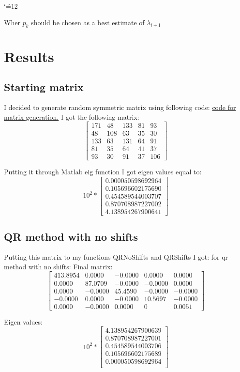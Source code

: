 \documentclass[12pt]{report}
\newenvironment{simplechar}{%
   \catcode`\^=12
}{}
\begin{document}
\begin{simplechar}
Wher $p_k$ should be chosen as a best estimate of $\lambda_{i+1}$

\newpage
\section{Results}
\subsection{Starting matrix}
I decided to generate random symmetric matrix using following code:
\hyperlink{function4_matrix_generation}{code for matrix generation.}
I got the following matrix:
\[
\begin{bmatrix}
171  &  48  & 133  &  81  &  93 \\
 48  & 108  &  63  &  35  &  30 \\
133  &  63  & 131  &  64  &  91 \\
 81  &  35  &  64  &  41  &  37 \\
 93  &  30  &  91  &  37  & 106
\end{bmatrix}
\]

Putting it through Matlab eig function I got eigen values equal to:
\[
10^{2} *
\begin{bmatrix}
  0.000050598692964 \\
  0.105696602175690 \\
  0.454589544003707 \\
  0.870708987227002 \\
  4.138954267900641
\end{bmatrix}
\]

\newpage
\subsection{QR method with no shifts}
Putting this matrix to my functions QRNoShifts and QRShifts I got:
for qr method with no shifts:
Final matrix:
\[
\begin{bmatrix}
413.8954  &  0.0000  & -0.0000  &  0.0000  &  0.0000 \\
 0.0000  & 87.0709  &  -0.0000  &  -0.0000  &  0.0000 \\
0.0000  &  -0.0000  & 45.4590  &  -0.0000  &  -0.0000 \\
 -0.0000  &  0.0000  &  -0.0000  &  10.5697  &  -0.0000 \\
 0.0000  &  -0.0000  &  0.0000  &  0  & 0.0051
\end{bmatrix}
\]

Eigen values:
\[
10^{2} *
\begin{bmatrix}
  4.138954267900639 \\
   0.870708987227001 \\
   0.454589544003706 \\
   0.105696602175689 \\
   0.000050598692964 \\
\end{bmatrix}
\]


\end{simplechar}
\end{document}
